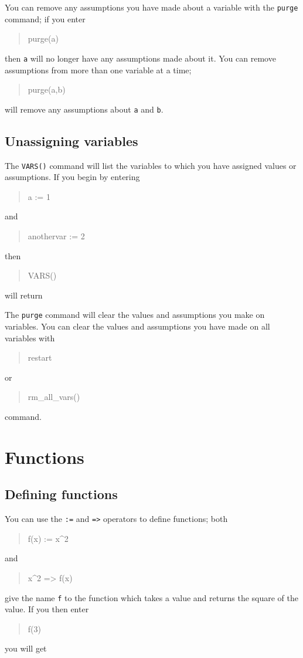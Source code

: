 \documentclass[a4paper,11pt]{book}
\newenvironment{giaccmd}
{\begin{quote}\ttfamily}
{\end{quote}}
\begin{document}
You can remove any assumptions you have made about a variable with the
\texttt{purge} command; if you enter
\begin{giaccmd}
  purge(a)
\end{giaccmd}
then \texttt{a} will no longer have any assumptions made about it.
You can remove assumptions from more than one variable at a time;
\begin{giaccmd}
  purge(a,b)
\end{giaccmd}
will remove any assumptions about \texttt{a} and \texttt{b}.

\subsection{Unassigning variables}

The \texttt{VARS()} command will list the variables to which you have
assigned values or assumptions.  If you begin by entering
\begin{giaccmd}
  a := 1
\end{giaccmd}
and
\begin{giaccmd}
  anothervar := 2
\end{giaccmd}
then 
\begin{giaccmd}
  VARS()
\end{giaccmd}
will return
\begin{giaccmd}
  [a, anothervar]
\end{giaccmd}

The \texttt{purge} command will clear the values and
assumptions you make on variables.  You can clear the values and
assumptions you have made on all variables with
\begin{giaccmd}
  restart
\end{giaccmd}
or
\begin{giaccmd}
  rm\_all\_vars()
\end{giaccmd}
command.

\section{Functions}

\subsection{Defining functions}

You can use the \texttt{:=}\index{:=} and \texttt{=>}\index{=>}
operators to define functions; both
\begin{giaccmd}
  f(x) := x\^{}2
\end{giaccmd}
and
\begin{giaccmd}
  x\^{}2 => f(x)
\end{giaccmd}
give the name \texttt{f} to the function which takes a value and 
returns the square of the value.  If you then enter
\begin{giaccmd}
  f(3)
\end{giaccmd}
you will get
\begin{giaccmd}
  9
\end{giaccmd}
\end{document}

